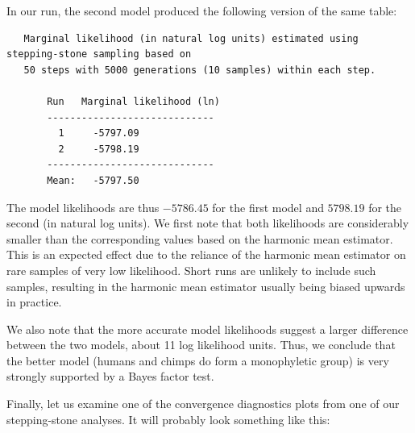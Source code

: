 \documentclass[12pt]{book}
\begin{document}
In our run, the second model produced the following version of the same table:

\scriptsize
\begin{singlespacing}
\begin{verbatim}
   Marginal likelihood (in natural log units) estimated using stepping-stone sampling based on
   50 steps with 5000 generations (10 samples) within each step. 

       Run   Marginal likelihood (ln)
       -----------------------------
         1     -5797.09   
         2     -5798.19   
       -----------------------------
       Mean:   -5797.50
\end{verbatim}
\end{singlespacing}
\normalsize

The model likelihoods are thus $-5786.45$ for the first model and $5798.19$ for the second (in natural log units).
We first note that both likelihoods are considerably smaller than the corresponding values based on the harmonic mean
estimator. This is an expected effect due to the reliance of the harmonic mean estimator on rare samples of 
very low likelihood. Short runs are unlikely to include such samples, resulting in the harmonic mean estimator
usually being biased upwards in practice.

We also note that the more accurate model likelihoods suggest a larger difference between the two models, about
11 log likelihood units. Thus, we conclude that the better model (humans and chimps do form a monophyletic group)
is very strongly supported by a Bayes factor test.

Finally, let us examine one of the convergence diagnostics plots from one of our stepping-stone analyses. It will
probably look something like this:
\end{document}
